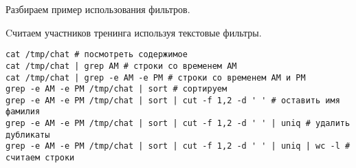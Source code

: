 \begin{frame}[fragile]{Разбираем пример использования фильтров.}
  \begin{block}{Cчитаем участников тренинга используя текстовые фильтры.}
\begin{lstlisting}
cat /tmp/chat # посмотреть содержимое
cat /tmp/chat | grep AM # строки со временем AM
cat /tmp/chat | grep -e AM -e PM # строки со временем AM и PM
grep -e AM -e PM /tmp/chat | sort # сортируем
grep -e AM -e PM /tmp/chat | sort | cut -f 1,2 -d ' ' # оставить имя фамилия
grep -e AM -e PM /tmp/chat | sort | cut -f 1,2 -d ' ' | uniq # удалить дубликаты
grep -e AM -e PM /tmp/chat | sort | cut -f 1,2 -d ' ' | uniq | wc -l # считаем строки 
\end{lstlisting}
  \end{block} 
\end{frame}
